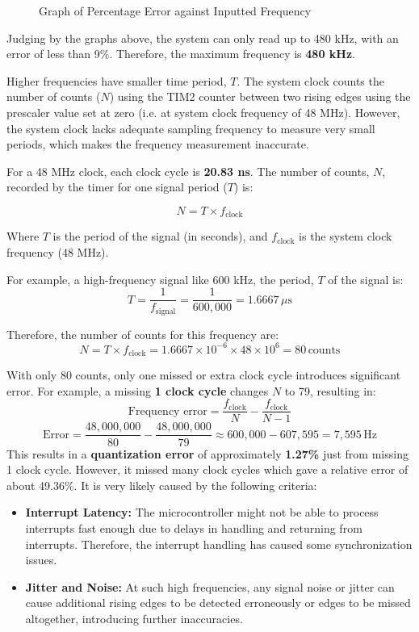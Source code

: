 \begin{figure}[H]
    \centering
    
    \caption{Graph of Percentage Error against Inputted Frequency}
    \label{fig:error_graph}
\end{figure}

Judging by the graphs above, the system can only read up to 480 kHz, with an error of less than 9\%. Therefore, the maximum frequency is \textbf{480 kHz}.

Higher frequencies have smaller time period, $T$. The system clock counts the number of counts ($N$) using the TIM2 counter between two rising edges using the prescaler value set at zero (i.e. at system clock frequency of 48 MHz).  However, the system clock lacks adequate sampling frequency to measure very small periods, which makes the frequency measurement inaccurate.

For a 48 MHz clock, each clock cycle is \textbf{20.83 ns}. The number of counts, \( N \), recorded by the timer for one signal period ($T$) is:

\begin{equation}\label{number_of_counts}
    N = T \times f_{\text{clock}}
\end{equation}

Where $T$ is the period of the signal (in seconds), and $f_{\text{clock}}$ is the system clock frequency (48 MHz).

For example, a high-frequency signal like 600 kHz, the period, $T$ of the signal is:
$$T = \frac{1}{f_{\text{signal}}} = \frac{1}{600,000} = 1.6667 \, \mu\text{s}$$

Therefore, the number of counts for this frequency are:
$$N = T \times f_{\text{clock}} = 1.6667 \times 10^{-6} \times 48 \times 10^6 = 80 \, \text{counts}$$

With only 80 counts, only one missed or extra clock cycle introduces significant error. For example, a missing \textbf{1 clock cycle} changes $N$ to 79, resulting in:
    \[
    \text{Frequency error} = \frac{f_{\text{clock}}}{N} - \frac{f_{\text{clock}}}{N-1}
    \]
    \[
    \text{Error} = \frac{48,000,000}{80} - \frac{48,000,000}{79} \approx 600,000 - 607,595 = 7,595 \, \text{Hz}
    \]
This results in a \textbf{quantization error} of approximately \textbf{1.27\%} just from missing 1 clock cycle. However, it missed many clock cycles which gave a relative error of about 49.36\%. It is very likely caused by the following criteria:

\begin{itemize}[leftmargin=2em]
    \item  \textbf{Interrupt Latency:} The microcontroller might not be able to process interrupts fast enough due to delays in handling and returning from interrupts. Therefore, the interrupt handling has caused some synchronization issues.
    \item \textbf{Jitter and Noise:} At such high frequencies, any signal noise or jitter can cause additional rising edges to be detected erroneously or edges to be missed altogether, introducing further inaccuracies.
\end{itemize}

